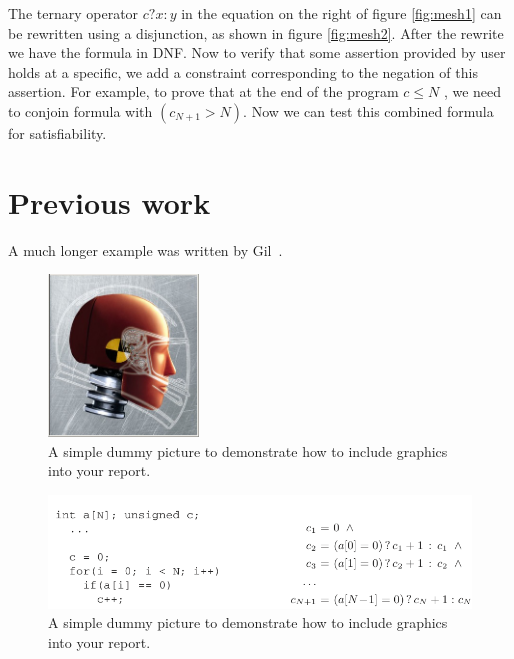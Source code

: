 \documentclass[14pt]{article}
\begin{document}
The ternary operator \(c?x:y\) in the equation on the right of figure \ref{fig:mesh1} can be rewritten using a disjunction, as shown in figure \ref{fig:mesh2}. After the rewrite we have the formula in DNF. Now to verify that some assertion provided by user holds at a specific, we add a constraint corresponding to the negation of this assertion. For example, to prove that at the end of the program \(c \leq N\) , we need to conjoin formula with \((c_{N+1}>N)\). Now we can test this combined formula for satisfiability. 





\section{Previous work}\label{previous work}
A much longer \LaTeXe{} example was written by Gil~\cite{Gil:02}.
\begin{figure}[htb!]
  \begin{centering}
    \includegraphics[width=4cm]{figures/dummy.jpg}\par
  \end{centering}
  \caption{A simple dummy picture to demonstrate how
           to include graphics into your report.}
  \label{fig:dummy}
\end{figure}
\begin{figure}[htb!]
  \begin{centering}
    \includegraphics[width=\textwidth]{figures/bmc-example-1}\par
  \end{centering}
  \caption{A simple dummy picture to demonstrate how
           to include graphics into your report.}
  \label{fig:dummy}
\end{figure}
\end{document}
